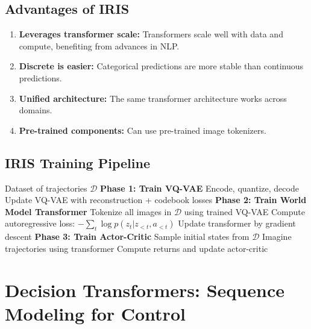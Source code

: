 \subsection{Advantages of IRIS}

\begin{enumerate}
    \item \textbf{Leverages transformer scale:} Transformers scale well with data and compute, benefiting from advances in NLP.

    \item \textbf{Discrete is easier:} Categorical predictions are more stable than continuous predictions.

    \item \textbf{Unified architecture:} The same transformer architecture works across domains.

    \item \textbf{Pre-trained components:} Can use pre-trained image tokenizers.
\end{enumerate}

\subsection{IRIS Training Pipeline}

\begin{algorithm}[H]
\caption{IRIS Training}
\begin{algorithmic}[1]
\Require Dataset of trajectories $\mathcal{D}$
\State \textbf{Phase 1: Train VQ-VAE}
    \State Encode, quantize, decode
    \State Update VQ-VAE with reconstruction + codebook losses
\EndFor
\State \textbf{Phase 2: Train World Model Transformer}
\State Tokenize all images in $\mathcal{D}$ using trained VQ-VAE
    \State Compute autoregressive loss: $-\sum_t \log p(z_t | z_{<t}, a_{<t})$
    \State Update transformer by gradient descent
\EndFor
\State \textbf{Phase 3: Train Actor-Critic}
    \State Sample initial states from $\mathcal{D}$
    \State Imagine trajectories using transformer
    \State Compute returns and update actor-critic
\EndFor
\end{algorithmic}
\end{algorithm}

\section{Decision Transformers: Sequence Modeling for Control}
\label{sec:decision_transformer}

